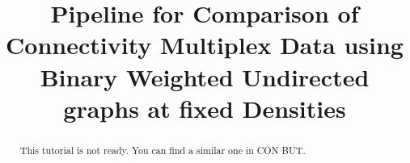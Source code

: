 \documentclass[justified]{tufte-handout}
\title{Pipeline for Comparison of Connectivity Multiplex Data using Binary Weighted Undirected graphs at fixed Densities}
\begin{document}
\maketitle

\begin{abstract}
\noindent
This tutorial is not ready. You can find a similar one in CON BUT.
\end{abstract}
\end{document}
